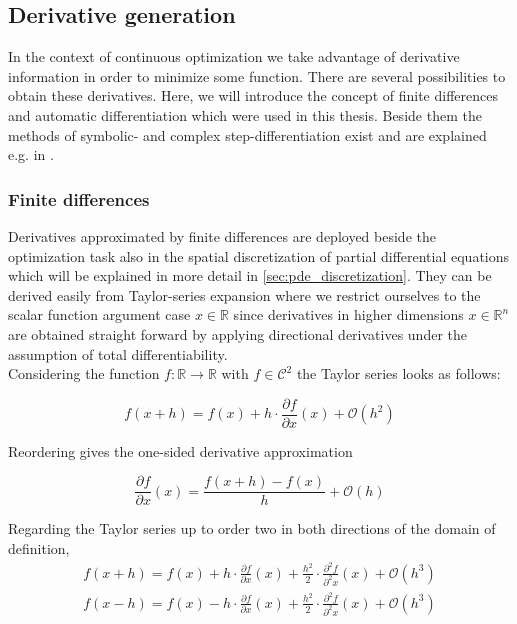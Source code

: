 \documentclass{scrartcl}[12pt, halfparskip]
\numberwithin{equation}{section}
\numberwithin{figure}{section}
\numberwithin{table}{section}
\begin{document}
\subsection{Derivative generation}
\label{sec:derivative_generation}
In the context of continuous optimization we take advantage of derivative information in order to minimize some function. 
There are several possibilities to obtain these derivatives. Here, we will introduce the concept of finite differences and automatic differentiation which were used in this thesis. 
Beside them the methods of symbolic- and complex step-differentiation exist and are explained e.g. in \cite{diss_jan}.

\subsubsection{Finite differences}
\label{sec:finite_differences}
Derivatives approximated by finite differences are deployed beside the optimization task also in the spatial discretization of partial differential equations which will be explained in more detail in \cref{sec:pde_discretization}.
They can be derived easily from Taylor-series expansion where we restrict ourselves to the scalar function argument case $x \in \mathbb{R}$ since derivatives in higher dimensions $x \in \mathbb{R}^n$ are obtained straight forward by applying directional derivatives under the assumption of total differentiability.  \\
Considering the function $f: \mathbb{R} \rightarrow \mathbb{R}$ with $f \in \mathcal{C}^2$ the Taylor series looks as follows:


\begin{equation}
f(x+h) = f(x) + h \cdot \frac{\partial f}{\partial x}(x) + \mathcal{O}(h^2)
\end{equation}

Reordering gives the one-sided derivative approximation

\begin{equation}
\frac{\partial f}{\partial x}(x) = \frac{f(x+h) - f(x)}{h} + \mathcal{O}(h)
\label{eq:one_sided_discretized_derivative}
\end{equation}

Regarding the Taylor series up to order two in both directions of the domain of definition,
\begin{subequations}
	\label{eq:finite_differences_taylor_exp}
	\begin{align}
	f(x+h) = f(x) + h \cdot \frac{\partial f}{\partial x}(x) + \frac{h^2}{2} \cdot \frac{\partial^2 f}{\partial^2 x}(x) + \mathcal{O}(h^3) \label{eq:finite_differences_taylor_exp_+} \\
	f(x-h) = f(x) - h \cdot \frac{\partial f}{\partial x}(x) + \frac{h^2}{2} \cdot \frac{\partial^2 f}{\partial^2 x}(x) + \mathcal{O}(h^3)  \label{eq:finite_differences_taylor_exp_-}	
	\end{align}
\end{subequations}
\end{document}
